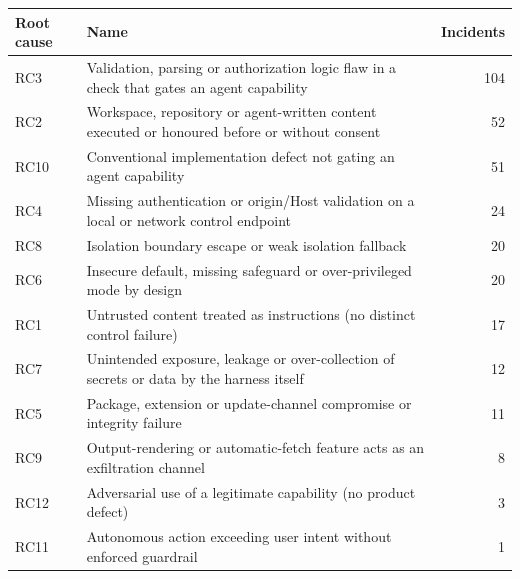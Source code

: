 \begin{tabular}{lp{6.2cm}r}
\toprule
Root cause & Name & Incidents \\
\midrule
RC3 & Validation, parsing or authorization logic flaw in a check that gates an agent capability & 104 \\
RC2 & Workspace, repository or agent-written content executed or honoured before or without consent & 52 \\
RC10 & Conventional implementation defect not gating an agent capability & 51 \\
RC4 & Missing authentication or origin/Host validation on a local or network control endpoint & 24 \\
RC8 & Isolation boundary escape or weak isolation fallback & 20 \\
RC6 & Insecure default, missing safeguard or over-privileged mode by design & 20 \\
RC1 & Untrusted content treated as instructions (no distinct control failure) & 17 \\
RC7 & Unintended exposure, leakage or over-collection of secrets or data by the harness itself & 12 \\
RC5 & Package, extension or update-channel compromise or integrity failure & 11 \\
RC9 & Output-rendering or automatic-fetch feature acts as an exfiltration channel & 8 \\
RC12 & Adversarial use of a legitimate capability (no product defect) & 3 \\
RC11 & Autonomous action exceeding user intent without enforced guardrail & 1 \\
\bottomrule
\end{tabular}
